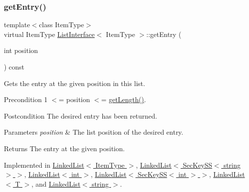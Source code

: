 \mbox{\label{classListInterface_a86987f69e5056d287212ede41db1956a}} 
\subsubsection{\texorpdfstring{get\+Entry()}{getEntry()}}
{\footnotesize\ttfamily template$<$class Item\+Type$>$ \\
virtual Item\+Type \hyperlink{classListInterface}{List\+Interface}$<$ Item\+Type $>$\+::get\+Entry (\begin{DoxyParamCaption}\item[{int}]{position }\end{DoxyParamCaption}) const\hspace{0.3cm}{\ttfamily [pure virtual]}}

Gets the entry at the given position in this list. \begin{DoxyPrecond}{Precondition}
1 $<$= position $<$= \hyperlink{classListInterface_afc85695d4137f1e29ff02e179c9f3221}{get\+Length()}. 
\end{DoxyPrecond}
\begin{DoxyPostcond}{Postcondition}
The desired entry has been returned. 
\end{DoxyPostcond}

\begin{DoxyParams}{Parameters}
{\em position} & The list position of the desired entry. \\
\hline
\end{DoxyParams}
\begin{DoxyReturn}{Returns}
The entry at the given position. 
\end{DoxyReturn}


Implemented in \hyperlink{classLinkedList_a341bfd7772c9d24d29eb7a7f3936915b}{Linked\+List$<$ Item\+Type $>$}, \hyperlink{classLinkedList_a341bfd7772c9d24d29eb7a7f3936915b}{Linked\+List$<$ Sec\+Key\+S\+S$<$ string $>$ $>$}, \hyperlink{classLinkedList_a341bfd7772c9d24d29eb7a7f3936915b}{Linked\+List$<$ int $>$}, \hyperlink{classLinkedList_a341bfd7772c9d24d29eb7a7f3936915b}{Linked\+List$<$ Sec\+Key\+S\+S$<$ int $>$ $>$}, \hyperlink{classLinkedList_a341bfd7772c9d24d29eb7a7f3936915b}{Linked\+List$<$ T $>$}, and \hyperlink{classLinkedList_a341bfd7772c9d24d29eb7a7f3936915b}{Linked\+List$<$ string $>$}.

\mbox{\label{classListInterface_a3e085e6ea9c5dc3e8007010cd889159c}} 
